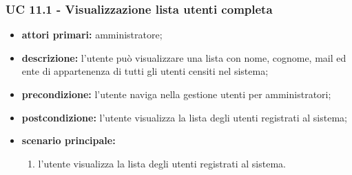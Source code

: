 			\subsubsection{UC 11.1 - Visualizzazione lista utenti completa}
			\begin{itemize}
				\item \textbf{attori primari:} amministratore;
				\item \textbf{descrizione:} l'utente può visualizzare una lista con nome, cognome, mail ed ente di appartenenza di tutti gli utenti censiti nel sistema;
				\item \textbf{precondizione:} l'utente naviga nella gestione utenti per amministratori;
				\item \textbf{postcondizione:} l'utente visualizza la lista degli utenti registrati al sistema;
				\item \textbf{scenario principale:}
				\begin{enumerate}
					\item{l'utente visualizza la lista degli utenti registrati al sistema.}
				\end{enumerate}
			\end{itemize}

